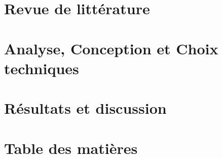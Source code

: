 \documentclass{ifri}
\begin{document}
\setcounter{page}{1}

\renewcommand{\glsnamefont}[1]{\textbf{#1}}
\printglossary[type=main, title=Glossaire, toctitle=Glossaire]
\cleardoublepage

\fancyhead[L]{\tiny \leftmark}
\fancyhead[R]{\scriptsize \rightmark}
\fancyfoot[C]{\thepage}



\chapter{Revue de littérature}\label{chap:1}


\chapter{Analyse, Conception et Choix techniques}\label{chap:2}


\chapter{Résultats et discussion}\label{chap:3}




\fancyhead[]{} \fancyhead[]{} \fancyhead[]{}

\cleardoublepage
\renewcommand{\bibname}{Bibliographie}
\nocite{*}



{}


\cleardoublepage
\setcounter{tocdepth}{3}
\chapter*{Table des matières}
{}
\makeatletter
{}
\makeatother
\end{document}
